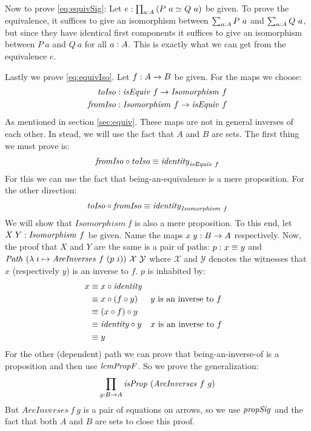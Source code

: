 Now to prove \ref{eq:equivSig}: Let $e \mathrel{:} \prod_{a \mathrel{:} A} \left( P\ a \simeq
Q\ a \right)$ be given. To prove the equivalence, it suffices to give an
isomorphism between $\sum_{a \tp A} P\ a$ and $\sum_{a \mathrel{:} A} Q\ a$, but since
they have identical first components it suffices to give an isomorphism between
$P\ a$ and $Q\ a$ for all $a \mathrel{:} A$. This is exactly what we can get from
the equivalence $e$.\QED

Lastly we prove \ref{eq:equivIso}. Let $f \mathrel{:} A \to B$ be given. For the maps we
choose:
%
\begin{align*}
\mathit{toIso}
  & \mathrel{:} \mathit{isEquiv}\ f             \to \mathit{Isomorphism}\ f \\
\mathit{fromIso}
  & \mathrel{:} \mathit{Isomorphism}\ f \to \mathit{isEquiv}\ f
\end{align*}
%
As mentioned in section \ref{sec:equiv}. These maps are not in general inverses
of each other. In stead, we will use the fact that $A$ and $B$ are sets. The first thing we must prove is:
%
\begin{align*}
  \mathit{fromIso} \circ \mathit{toIso} \equiv \mathit{identity}_{\mathit{isEquiv}\ f}
\end{align*}
%
For this we can use the fact that being-an-equivalence is a mere proposition.
For the other direction:
%
\begin{align*}
  \mathit{toIso} \circ \mathit{fromIso} \equiv \mathit{identity}_{\mathit{Isomorphism}\ f}
\end{align*}
%
We will show that $\mathit{Isomorphism}\ f$ is also a mere proposition. To this
end, let $X\;Y \mathrel{:} \mathit{Isomorphism}\ f$ be given. Name the maps $x\;y \mathrel{:} B
\to A$ respectively. Now, the proof that $X$ and $Y$ are the same is a pair of
paths: $p \mathrel{:} x \equiv y$ and $\mathit{Path}\ (\lambda\; i \mapsto
\mathit{AreInverses}\ f\ (p\ i))\ \mathcal{X}\ \mathcal{Y}$ where $\mathcal{X}$
and $\mathcal{Y}$ denotes the witnesses that $x$ (respectively $y$) is an
inverse to $f$. $p$ is inhabited by:
%
\begin{align*}
  x
  & \equiv x \circ \mathit{identity} \\
  & \equiv x \circ (f \circ y)
  && \text{$y$ is an inverse to $f$} \\
  & \equiv (x \circ f) \circ y \\
  & \equiv \mathit{identity} \circ y
  && \text{$x$ is an inverse to $f$} \\
  & \equiv y
\end{align*}
%
For the other (dependent) path we can prove that being-an-inverse-of is a
proposition and then use $\mathit{lemPropF}$. So we prove the generalization:
%
\begin{align}
\label{eq:propAreInversesGen}
\prod_{g \mathrel{:} B \to A} \mathit{isProp}\ (\mathit{AreInverses}\ f\ g)
\end{align}
%
But $\mathit{AreInverses}\ f\ g$ is a pair of equations on arrows, so we use
$\mathit{propSig}$ and the fact that both $A$ and $B$ are sets to close this proof.

